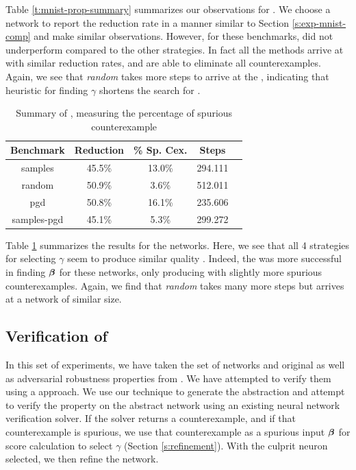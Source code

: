 Table \ref{t:mnist-prop-summary} summarizes our observations for \mnist. We
choose a network to report the reduction rate in a manner similar to Section
\ref{s:exp-mnist-comp} and make similar observations. However, for these
benchmarks, \pgd did not underperform compared to the other strategies. In fact
all the methods arrive at
\abs with similar reduction rates, and are able to eliminate all
counterexamples. Again, we see that \textit{random} takes more steps
to arrive at the \abs, indicating that heuristic for finding $\gamma$ shortens
the search for \abs.

\begin{table}
\begin{tabular}{|c|c|c|c|c|}
\hline
Benchmark   & Reduction  & \% Sp. Cex. & Steps    \\
\hline
samples     & 45.5\%     &  13.0\%     & 294.111  \\
random      & 50.9\%     &  3.6\%      & 512.011  \\
pgd         & 50.8\%     &  16.1\%     & 235.606  \\
samples-pgd & 45.1\%     &  5.3\%      & 299.272  \\
\hline
\end{tabular}
\caption{Summary of \acasxu, measuring the percentage of spurious counterexample }
\label{t:acas-ncex}
\end{table}

Table \ref{t:acas-ncex} summarizes the results for the \acasxu networks. Here,
we see that all 4 strategies for selecting $\gamma$ seem to produce 
similar quality \abs. Indeed, the \pgd was more successful in finding
$\boldsymbol{\beta}$ for these networks, only producing \abs with slightly more
spurious counterexamples.
Again, we find that \textit{random} takes many more steps but arrives at a
network of similar size.

\subsection{Verification of \acasxu}
\label{s:acas-verif}

In this set of experiments, we have taken the \acasxu set of
networks and original as well as adversarial robustness properties from
\cite{reluplex, cegar-nn}. We have attempted to verify them using a \cegar
approach. We
use our technique to generate the abstraction and attempt to verify the
property on the abstract network using an existing neural network verification
solver. If the solver returns a counterexample, and if that counterexample is
spurious, we use that counterexample as a spurious input $\boldsymbol{\beta}$ for score
calculation to select $\gamma$ (Section \ref{s:refinement}). With the culprit
neuron selected, we then refine the network.

